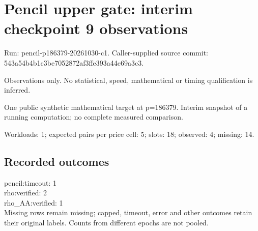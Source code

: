 \documentclass[10pt]{article}
\begin{document}
\raggedright\sloppy\section*{Pencil upper gate: interim checkpoint 9 observations}
Run: pencil-p186379-20261030-c1. Caller-supplied source commit: 543a54b4b1c3be7052872af3ffe393a44c69a3c3.\par
Observations only. No statistical, speed, mathematical or timing qualification is inferred.\par
One public synthetic mathematical target at p=186379. Interim snapshot of a running computation; no complete measured comparison.\par Workloads: 1; expected pairs per price cell: 5; slots: 18; observed: 4; missing: 14.\par
\subsection*{Recorded outcomes}
pencil:timeout: 1\\
rho:verified: 2\\
rho\_AA:verified: 1\\
 Missing rows remain missing; capped, timeout, error and other outcomes retain their original labels. Counts from different epochs are not pooled.\par
\end{document}
